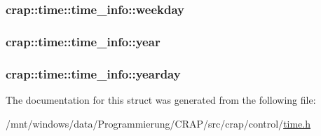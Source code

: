 \hypertarget{structcrap_1_1time_1_1time__info_a53f401c11fa1b828ab59d9f46c31939d}{
\subsubsection[{weekday}]{ crap\-::time\-::time\-\_\-info\-::weekday}}\label{structcrap_1_1time_1_1time__info_a53f401c11fa1b828ab59d9f46c31939d}
\hypertarget{structcrap_1_1time_1_1time__info_aab40e5fecd12881e84dea8449c7dc7b2}{
\subsubsection[{year}]{ crap\-::time\-::time\-\_\-info\-::year}}\label{structcrap_1_1time_1_1time__info_aab40e5fecd12881e84dea8449c7dc7b2}
\hypertarget{structcrap_1_1time_1_1time__info_a286c0bab84aba2063b13770ab235e4e3}{
\subsubsection[{yearday}]{ crap\-::time\-::time\-\_\-info\-::yearday}}\label{structcrap_1_1time_1_1time__info_a286c0bab84aba2063b13770ab235e4e3}


The documentation for this struct was generated from the following file\-:\begin{DoxyCompactItemize}
\item 
/mnt/windows/data/\-Programmierung/\-C\-R\-A\-P/src/crap/control/\hyperlink{time_8h}{time.\-h}\end{DoxyCompactItemize}
